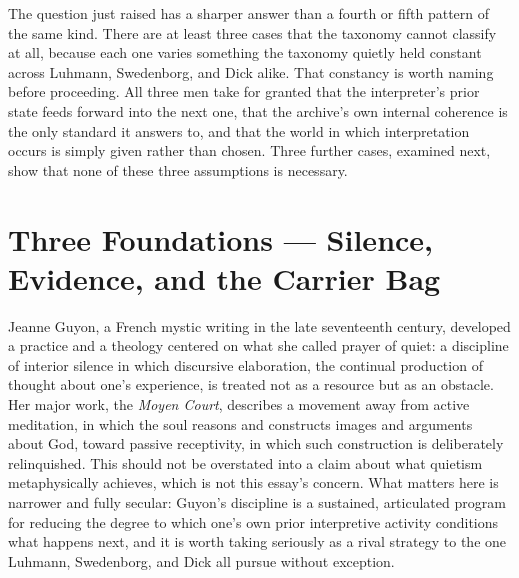 \documentclass[11pt]{article}
\begin{document}
The question just raised has a sharper answer than a fourth or fifth pattern of the same kind. There are at least three cases that the taxonomy cannot classify at all, because each one varies something the taxonomy quietly held constant across Luhmann, Swedenborg, and Dick alike. That constancy is worth naming before proceeding. All three men take for granted that the interpreter's prior state feeds forward into the next one, that the archive's own internal coherence is the only standard it answers to, and that the world in which interpretation occurs is simply given rather than chosen. Three further cases, examined next, show that none of these three assumptions is necessary.

\section{Three Foundations --- Silence, Evidence, and the Carrier Bag}

Jeanne Guyon, a French mystic writing in the late seventeenth century, developed a practice and a theology centered on what she called prayer of quiet: a discipline of interior silence in which discursive elaboration, the continual production of thought about one's experience, is treated not as a resource but as an obstacle. Her major work, the \emph{Moyen Court}, describes a movement away from active meditation, in which the soul reasons and constructs images and arguments about God, toward passive receptivity, in which such construction is deliberately relinquished. This should not be overstated into a claim about what quietism metaphysically achieves, which is not this essay's concern. What matters here is narrower and fully secular: Guyon's discipline is a sustained, articulated program for reducing the degree to which one's own prior interpretive activity conditions what happens next, and it is worth taking seriously as a rival strategy to the one Luhmann, Swedenborg, and Dick all pursue without exception.
\end{document}
